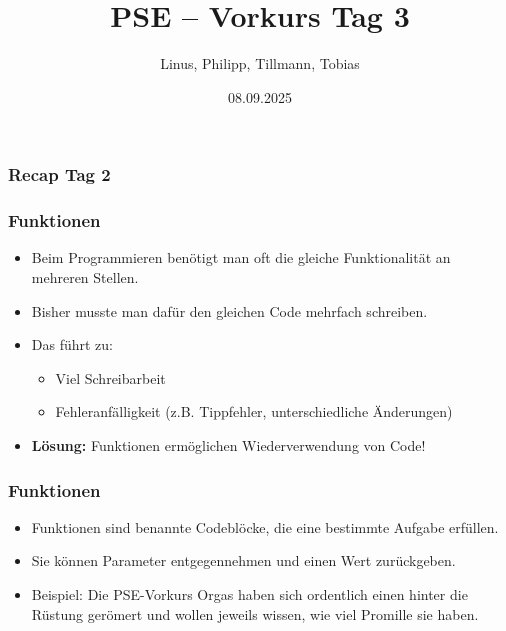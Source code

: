 \documentclass{../../presentation}
\title{PSE – Vorkurs Tag 3}
\author{Linus, Philipp, Tillmann, Tobias}
\institute{FIUS - Fachgruppe Informatik Universität Stuttgart}
\date{08.09.2025}
\begin{document}
\begin{frame}
    \titlepage
\end{frame}

\begin{frame}
    \listoftodos
\end{frame}

\begin{frame}
    \frametitle{Recap Tag 2}
\end{frame}

\begin{frame}[fragile]
    \frametitle{Funktionen}
    \begin{itemize}
        \item Beim Programmieren benötigt man oft die gleiche Funktionalität an mehreren Stellen.
        \item Bisher musste man dafür den gleichen Code mehrfach schreiben.
        \item Das führt zu:
              \begin{itemize}
                  \item Viel Schreibarbeit
                  \item Fehleranfälligkeit (z.B. Tippfehler, unterschiedliche Änderungen)
              \end{itemize}
        \item \textbf{Lösung:} Funktionen ermöglichen Wiederverwendung von Code!
    \end{itemize}
\end{frame}

\begin{frame}
    \frametitle{Funktionen}
    \begin{itemize}
        \item Funktionen sind benannte Codeblöcke, die eine bestimmte Aufgabe erfüllen.
        \item Sie können Parameter entgegennehmen und einen Wert zurückgeben.
        \item Beispiel: Die PSE-Vorkurs Orgas haben sich ordentlich einen hinter die Rüstung gerömert und wollen jeweils wissen, wie viel Promille sie haben.
    \end{itemize}
\end{frame}
\end{document}
